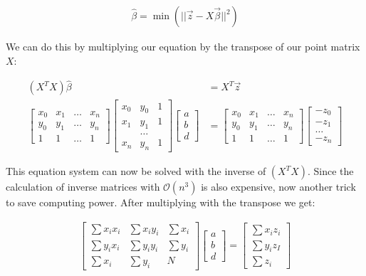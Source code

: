 \documentclass[11pt,oneside,openright]{mpreport}
\begin{document}
\begin{align*}
\hat{\beta} = \min{(|| \vec{z} - X\vec{\beta} ||^2)}
\end{align*}

We can do this by multiplying our equation by the transpose of our point matrix $X$:

\begin{align*}
(X^TX) \hat{\beta} &= X^T \vec{z}\\
\begin{bmatrix}
x_0 & x_1 & \dots & x_n \\
y_0 & y_1 & \dots & y_n \\
1 & 1 & \dots & 1  
\end{bmatrix} 
\begin{bmatrix}
x_0 & y_0 & 1 \\
x_1 & y_1 & 1 \\
 & \dots & \\
x_n & y_n & 1 
\end{bmatrix} 
\begin{bmatrix}
a \\
b \\
d 
\end{bmatrix} 
 &= 
\begin{bmatrix}
x_0 & x_1 & \dots & x_n \\
y_0 & y_1 & \dots & y_n \\
1 & 1 & \dots & 1  
\end{bmatrix} 
\begin{bmatrix}
-z_0 \\
-z_1 \\
\dots \\
-z_n 
\end{bmatrix} 
\end{align*}
% 

This equation system can now be solved with the inverse of $(X^TX)$. Since the calculation of inverse matrices with $\mathcal{O}(n^3)$ is also expensive, now another trick to save computing power.
After multiplying with the transpose we get:

\begin{align*}
\begin{bmatrix}
\sum x_i x_i & \sum x_i y_i & \sum x_i \\
\sum y_i x_i & \sum y_i y_i & \sum y_i \\
\sum x_i & \sum y_i & N
\end{bmatrix} 
\begin{bmatrix}
a \\
b \\
d 
\end{bmatrix} 
 = 
\begin{bmatrix}
\sum x_i z_i \\
\sum y_i z_I \\
\sum z_i 
\end{bmatrix} 
\end{align*}
\end{document}
